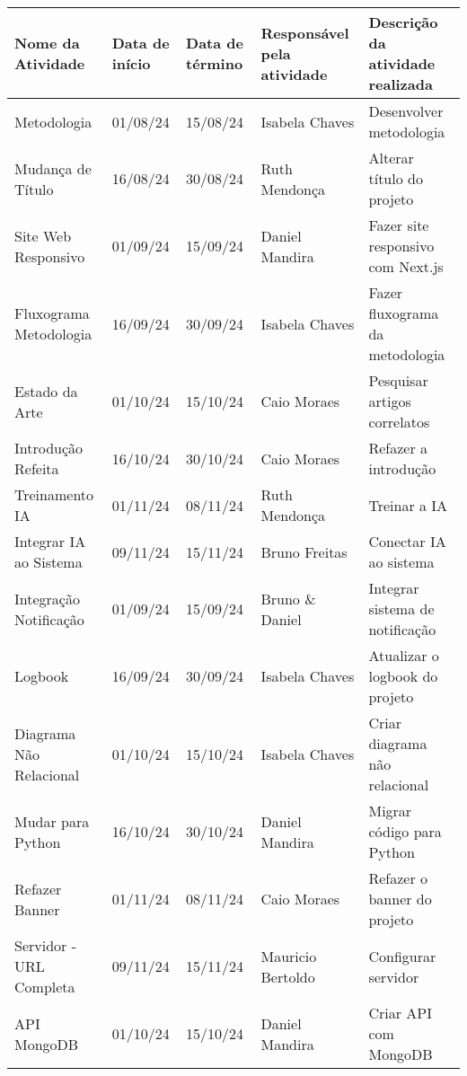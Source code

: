 \documentclass[
landscape,
  a4paper,%
  12pt,%
  english,%
  brazilian,%
]{article}
\begin{document}
 \begin{table}[]
\centering
\begin{tabular}{|l|l|l|l|l|}
\hline
Nome da Atividade & Data de início & Data de término & Responsável pela atividade & Descrição da atividade realizada \\ \hline
Metodologia                 &  01/08/24  & 15/08/24  & Isabela Chaves        & Desenvolver metodologia                    \\\hline
Mudança de Título           &  16/08/24  & 30/08/24  & Ruth Mendonça         & Alterar título do projeto                  \\\hline
Site Web Responsivo         &  01/09/24  & 15/09/24  & Daniel Mandira        & Fazer site responsivo com Next.js          \\\hline
Fluxograma Metodologia      &  16/09/24  & 30/09/24  & Isabela Chaves        & Fazer fluxograma da metodologia            \\\hline
Estado da Arte              &  01/10/24  & 15/10/24  & Caio Moraes           & Pesquisar artigos correlatos               \\\hline
Introdução Refeita          &  16/10/24  & 30/10/24  & Caio Moraes           & Refazer a introdução                        \\\hline
Treinamento IA              &  01/11/24  & 08/11/24  & Ruth Mendonça         & Treinar a IA                                \\\hline
Integrar IA ao Sistema      &  09/11/24  & 15/11/24  & Bruno Freitas         & Conectar IA ao sistema                     \\\hline
Integração Notificação      &  01/09/24  & 15/09/24  & Bruno \& Daniel       & Integrar sistema de notificação            \\\hline
Logbook                     &  16/09/24  & 30/09/24  & Isabela Chaves        & Atualizar o logbook do projeto             \\\hline
Diagrama Não Relacional     &  01/10/24  & 15/10/24  & Isabela Chaves        & Criar diagrama não relacional              \\\hline
Mudar para Python           &  16/10/24  & 30/10/24  & Daniel Mandira        & Migrar código para Python                  \\\hline
Refazer Banner              &  01/11/24  & 08/11/24  & Caio Moraes           & Refazer o banner do projeto                \\\hline
Servidor - URL Completa     &  09/11/24  & 15/11/24  & Mauricio Bertoldo     & Configurar servidor                        \\\hline
API MongoDB                 &  01/10/24  & 15/10/24  & Daniel Mandira        & Criar API com MongoDB                      \\\hline



  
\end{tabular}
\end{table}
\end{document}
